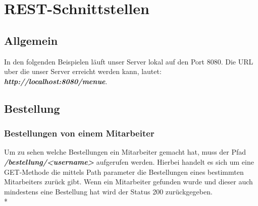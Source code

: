 \section{REST-Schnittstellen}



\subsection{Allgemein}

In den folgenden Beispielen läuft unser Server lokal auf den Port 8080. Die URL uber die unser
Server erreicht werden kann, lautet: \textbf{\textit{http://localhost:8080/menue}}.

\pagebreak

\subsection{Bestellung}

\subsubsection{Bestellungen von einem Mitarbeiter}

Um zu sehen welche Bestellungen ein Mitarbeiter gemacht hat, muss der Pfad \textbf{\textit{/bestellung/<username>}} aufgerufen werden. 
Hierbei handelt es sich um eine GET-Methode die mittels Path parameter die Bestellungen eines bestimmten Mitarbeiters zurück gibt.
Wenn ein Mitarbeiter gefunden wurde und dieser auch mindestens eine Bestellung hat wird der Status 200 zurückgegeben. \\*


